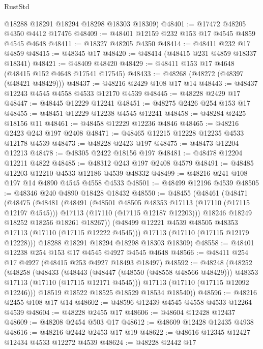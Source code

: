 \begin{lexlean}{RustStd}
\begin{coremodule}
      @18288
      @18291
      @18294
      @18298
      @18303
      @18309)
@48401 := @17472 @48205 @4350 @4412 @17476
@48409 := @48401 @12159 @232 @153 @17 @4545 @4859 @4545 @4648
@48411 := @18327 @48205 @4350
@48414 := @48411 @232 @17 @4859
@48415 := @48345 @17
@48420 := @48414 (@48415 @231 @4859 @18337 @18341)
@48421 := @48409 @48420
@48429 := @48411 @153 @17 @4648 (@48415 @152 @4648 @17541 @17545)
@48433 := @48268 (@48272 (@48397 (@48421 @48429)))
@48437 := @48216 @2429 @108 @17 @14
@48443 := @48437 @12243 @4545 @4558 @4533 @12170 @4539
@48445 := @48228 @2429 @17
@48447 := @48445 @12229 @12241
@48451 := @48275 @2426 @254 @153 @17
@48455 := @48451 @12229 @12238 @4545 @12241
@48458 := @48284 @2425 @18156 @11
@48461 := @48458 @12229 @12236 @4846
@48465 := @48216 @2423 @243 @197 @2408
@48471 := @48465 @12215 @12228 @12235 @4533 @12178 @4539
@48473 := @48228 @2423 @197
@48475 := @48473 @12204 @12213
@48478 := @48305 @2422 @18156 @197
@48481 := @48478 @12204 @12211 @4822
@48485 := @48312 @243 @197 @2408 @4579
@48491 := @48485 @12203 @12210 @4533 @12186 @4539 @48332
@48499 := @48216 @241 @108 @197 @14 @4890 @4545 @4558 @4533
@48501 := @48499 @12196 @4539
@48505 := @48346 @240 @4890 @18428 @18432
@48550 := @48455
    (@48461
      (@48471
        (@48475
          (@48481
            (@48491
              (@48501 @48505 @48353 @17113 (@17110 (@17115 @12197 @4545)))
              @17113
              (@17110 (@17115 @12187 @12203)))
            @18246
            @18249
            @18252
            @18256
            @18261
            @18267))
        (@48499 @12221 @4539 @48505 @48353 @17113 (@17110 (@17115 @12222 @4545)))
        @17113
        (@17110 (@17115 @12179 @12228)))
      @18288
      @18291
      @18294
      @18298
      @18303
      @18309)
@48558 := @48401 @12238 @254 @153 @17 @4545 @4927 @4545 @4648
@48566 := @48411 @254 @17 @4927 (@48415 @253 @4927 @18493 @18497)
@48592 := @48248
    (@48252
      (@48258
        (@48433
          (@48443
            (@48447 (@48550 (@48558 @48566 @48429)))
            @48353
            @17113
            (@17110 (@17115 @12171 @4545)))
          @17113
          (@17110 (@17115 @12092 @12246)))
        @18519
        @18522
        @18525
        @18529
        @18534
        @18540))
@48596 := @48216 @2455 @108 @17 @14
@48602 := @48596 @12439 @4545 @4558 @4533 @12264 @4539
@48604 := @48228 @2455 @17
@48606 := @48604 @12428 @12437
@48609 := @48208 @2454 @503 @17
@48612 := @48609 @12428 @12435 @4938
@48616 := @48216 @2442 @2453 @17 @19
@48622 := @48616 @12345 @12427 @12434 @4533 @12272 @4539
@48624 := @48228 @2442 @17

\end{coremodule}
\end{lexlean}

